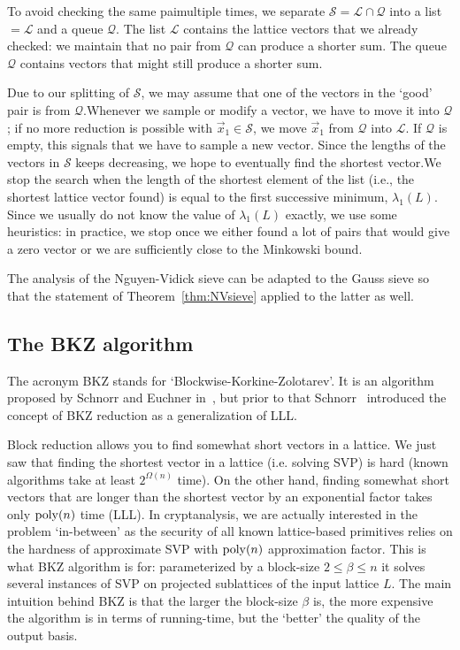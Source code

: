 To avoid checking the same paimultiple times, we separate $\mathcal{S}=\mathcal{L} \cap \mathcal{Q}$ into a list $=\mathcal{L} $ and a queue $\mathcal{Q}$. The list $\mathcal{L}$ contains the lattice vectors that we already checked: we maintain that no pair from $\mathcal{Q}$ can produce a shorter sum. The queue $\mathcal{Q}$ contains vectors that might still produce a shorter sum.
 
Due to our splitting of $\mathcal{S}$, we may assume that one of the vectors in the `good' pair is from $\mathcal{Q}$.Whenever we sample or modify a vector, we have to move it into $\mathcal{Q}$; if no more reduction is possible with $\vec x_1 \in \mathcal{S}$, we move $\vec x_1$ from $\mathcal{Q}$ into $\mathcal{L}$.  If $\mathcal{Q}$ is empty, this signals that we have to sample a new vector.
Since the lengths of the vectors in $\mathcal{S}$ keeps decreasing, we hope to eventually find the shortest vector.We stop the search when the length of the shortest element of the list (i.e., the shortest lattice vector found) is equal to the first successive minimum, $\lambda_1(L)$.
Since we usually do not know the value of $\lambda_1(L)$ exactly, we use some heuristics:  in practice, we stop once we either found a lot of pairs that would give a zero vector or we are sufficiently close to the Minkowski bound.

The analysis of the Nguyen-Vidick sieve can be adapted to the Gauss sieve so that the statement of Theorem~\ref{thm:NVsieve} applied to the latter as well.
 
 

\subsection{The BKZ algorithm} 

The acronym BKZ stands for `Blockwise-Korkine-Zolotarev'. It is an algorithm proposed by  Schnorr and Euchner in~\cite{SchE94}, but prior to that Schnorr~\cite{S87} introduced the concept of BKZ reduction as a generalization of LLL.

Block reduction allows you to find somewhat short vectors in a lattice. We just saw that finding the shortest vector in a lattice (i.e. solving SVP) is  hard (known algorithms take at least $2^{\Omega(n)}$ time). On the other hand, finding somewhat short vectors that are longer than the shortest vector by an exponential factor takes only $\operatorname{poly}(n)$ time (LLL). In cryptanalysis, we are actually interested in the problem `in-between' as the security of all known lattice-based primitives relies on the hardness of approximate SVP with $\operatorname{poly}(n)$ approximation factor. This is what BKZ algorithm is for: parameterized by a block-size $2 \leq \beta \leq n$ it solves several instances of SVP on projected sublattices of the input lattice $L$.
The main intuition behind BKZ is that the larger the block-size $\beta$ is, the more expensive the algorithm is in terms of running-time, but the `better' the quality of the output basis.


